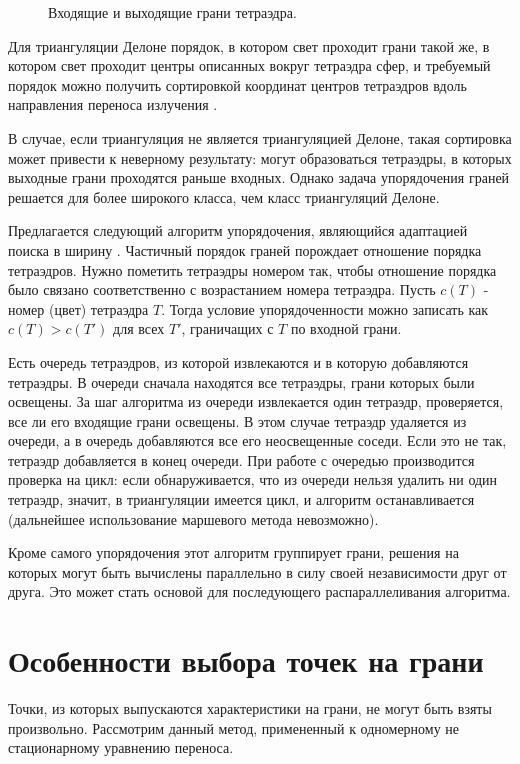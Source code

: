 \begin{figure}[ht!]
\caption{Входящие и выходящие грани тетраэдра.}
\label{fig:4}
\end{figure}

Для триангуляции Делоне порядок, в котором свет проходит грани такой же, в котором свет проходит центры описанных вокруг тетраэдра сфер, и требуемый порядок можно получить сортировкой координат центров тетраэдров вдоль направления переноса излучения \cite{skalko_2014}.

В случае, если триангуляция не является триангуляцией Делоне, такая сортировка может привести к неверному результату: могут образоваться тетраэдры, в которых выходные грани проходятся раньше входных. Однако задача упорядочения граней решается для более широкого класса, чем класс триангуляций Делоне. 

Предлагается следующий алгоритм упорядочения, являющийся адаптацией поиска в ширину \cite{corm_2009}. Частичный порядок граней порождает отношение порядка тетраэдров. Нужно пометить тетраэдры номером так, чтобы отношение порядка было связано соответственно с возрастанием номера тетраэдра. Пусть $c(T)$ - номер (цвет) тетраэдра $T$. Тогда условие упорядоченности можно записать как $ c(T) > c (T')$ для всех $T'$, граничащих с $T$ по входной грани. 

Есть очередь тетраэдров, из которой извлекаются и в которую добавляются тетраэдры. В очереди сначала находятся все тетраэдры, грани которых были освещены. За шаг алгоритма из очереди извлекается один тетраэдр, проверяется, все ли его входящие грани освещены. В этом случае тетраэдр удаляется из очереди, а в очередь добавляются все его неосвещенные соседи. Если это не так, тетраэдр добавляется в конец очереди. При работе с очередью производится проверка на цикл: если обнаруживается, что из очереди нельзя удалить ни один тетраэдр, значит, в триангуляции имеется цикл, и алгоритм останавливается (дальнейшее использование маршевого метода невозможно).

Кроме самого упорядочения этот алгоритм группирует грани, решения на которых могут быть вычислены параллельно в силу своей независимости друг от друга. Это может стать основой для последующего распараллеливания алгоритма.
\section{Особенности выбора точек на грани}
Точки, из которых выпускаются характеристики на грани, не могут быть взяты произвольно. Рассмотрим данный метод, примененный к одномерному не стационарному уравнению переноса.

